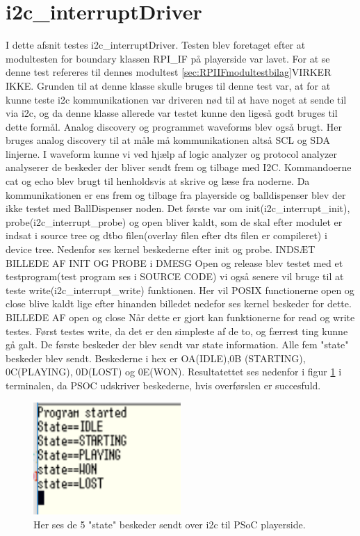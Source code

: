 \documentclass[Modultest/Modultest_main.tex]{subfiles}
\begin{document}
\section{i2c\_interruptDriver}
I dette afsnit testes i2c\_interruptDriver. Testen blev foretaget efter at modultesten for boundary klassen RPI\_IF på playerside var lavet. For at se denne test refereres til dennes modultest \ref{sec:RPIIFmodultestbilag}VIRKER IKKE. Grunden til at denne klasse skulle bruges til denne test var, at for at kunne teste i2c kommunikationen var driveren nød til at have noget at sende til via i2c, og da denne klasse allerede var testet kunne den ligeså godt bruges til dette formål. Analog discovery og programmet waveforms blev også brugt. Her bruges analog discovery til at måle må kommunikationen altså SCL og SDA linjerne. I waveform kunne vi ved hjælp af logic analyzer og protocol analyzer analyserer de beskeder der bliver sendt frem og tilbage med I2C. Kommandoerne cat og echo blev brugt til henholdsvis at skrive og læse fra noderne. Da kommunikationen er ens frem og tilbage fra playerside og balldispenser blev der ikke testet med BallDispenser noden. Det første var om init(i2c\_interrupt\_init), probe(i2c\_interrupt\_probe) og open bliver kaldt, som de skal efter modulet er indsat i source tree og dtbo filen(overlay filen efter dts filen er compileret) i device tree. Nedenfor ses kernel beskederne efter init og probe.
INDSÆT BILLEDE AF INIT OG PROBE i DMESG
Open og release blev testet med et testprogram(test program ses i SOURCE CODE) vi også senere vil bruge til at teste write(i2c\_interrupt\_write) funktionen. Her vil POSIX functionerne open og close blive kaldt lige efter hinanden billedet nedefor ses kernel beskeder for dette. 
BILLEDE AF open og close
Når dette er gjort kan funktionerne for read og write testes. Først testes write, da det er den simpleste af de to, og færrest ting kunne gå galt. De første beskeder der blev sendt var state information. Alle fem "state" beskeder blev sendt. Beskederne i hex er OA(IDLE),0B (STARTING), 0C(PLAYING), 0D(LOST) og 0E(WON).  Resultatettet ses nedenfor i figur \ref{fig:states_write} i terminalen, da PSOC udskriver beskederne, hvis overførslen er succesfuld.
\begin{figure}[H]
    \centering
    \includegraphics[width=0.5\textwidth]{Modultest/i2c_interruptDriver/graphics/states.PNG}
    \caption{Her ses de 5 "state" beskeder sendt over i2c til PSoC playerside.}
    \label{fig:states_write}
\end{figure}
\end{document}
